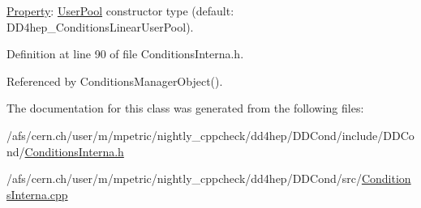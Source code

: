 \hyperlink{class_d_d4hep_1_1_property}{Property}: \hyperlink{class_d_d4hep_1_1_conditions_1_1_user_pool}{UserPool} constructor type (default: DD4hep\_\-ConditionsLinearUserPool). 

Definition at line 90 of file ConditionsInterna.h.

Referenced by ConditionsManagerObject().

The documentation for this class was generated from the following files:\begin{DoxyCompactItemize}
\item 
/afs/cern.ch/user/m/mpetric/nightly\_\-cppcheck/dd4hep/DDCond/include/DDCond/\hyperlink{_d_d_cond_2include_2_d_d_cond_2_conditions_interna_8h}{ConditionsInterna.h}\item 
/afs/cern.ch/user/m/mpetric/nightly\_\-cppcheck/dd4hep/DDCond/src/\hyperlink{_d_d_cond_2src_2_conditions_interna_8cpp}{ConditionsInterna.cpp}\end{DoxyCompactItemize}

